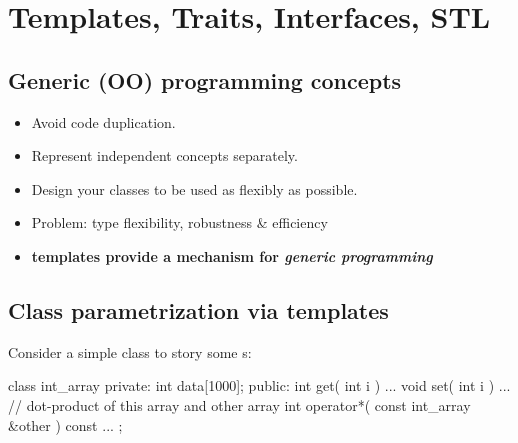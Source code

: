 



\chapter{Templates, Traits, Interfaces, STL}

\section{Generic (OO) programming concepts}

\begin{itemize}
\item Avoid code duplication.
\item Represent independent concepts separately.
\item Design your classes to be used as flexibly as possible.
\item Problem: type flexibility, robustness \& efficiency
\item \bfseries{templates} provide a mechanism for \emph{generic programming}
\end{itemize}


\section{Class parametrization via templates}
Consider a simple class to story some s:
\begin{myverbatim}
class int_array {
  private:
    int data[1000];
  public:
    int get( int i ) { ... }
    void set( int i ) { ... }
    // dot-product of this array and other array
    int operator*( const int_array &other ) const { ... }
};
\end{myverbatim}

